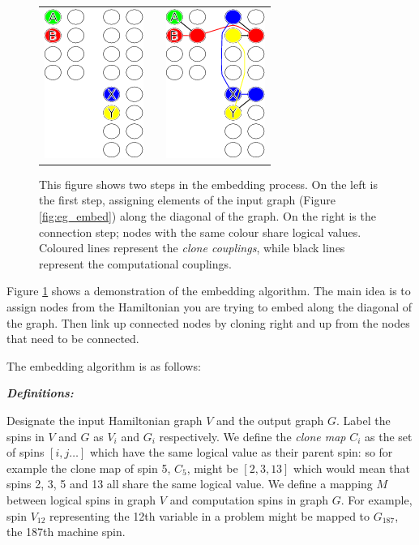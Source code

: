 \begin{figure}
	\begin{tabular}{l l l}
		\includegraphics[bb= 0 0 122 184]{img/eg_embed_full.png} & \hspace{1 in} &\includegraphics[bb= 0 0 122 184]{img/eg_embed_full2.png} \\
	\end{tabular}
	\caption[Embedding Algorithm]{This figure shows two steps in the embedding process.  On the left is the first step, assigning elements of the input graph (Figure \ref{fig:eg_embed}) along the diagonal of the \machine graph.  On the right is the connection step; nodes with the same colour share logical values.  Coloured lines represent the \emph{clone couplings}, while black lines represent the computational couplings.}
	\label{fig:embedding}
\end{figure}

Figure \ref{fig:embedding} shows a demonstration of the embedding algorithm.  The main idea is to assign nodes from the Hamiltonian you are trying to embed along the diagonal of the \machine graph.  Then link up connected nodes by cloning right and up from the nodes that need to be connected.

The embedding algorithm is as follows:

\emph{\textbf{Definitions:}}

Designate the input Hamiltonian graph $V$ and the output graph $G$.  Label the spins in $V$ and $G$ as $V_i$ and $G_i$ respectively.
We define the \emph{clone map} $C_i$ as the set of spins $[i,j \ldots]$ which have the same logical value as their parent spin: so for example the clone map of spin 5, $C_5$, might be $[2,3,13]$ which would mean that spins 2, 3, 5 and 13 all share the same logical value.  
We define a mapping $M$ between logical spins in graph $V$ and computation spins in graph $G$.  For example, spin $V_{12}$ representing the 12th variable in a problem might be mapped to $G_{187}$, the 187th machine spin.

